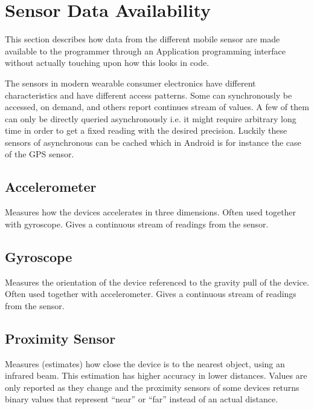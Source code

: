 
\section{Sensor Data Availability}
\label{sec:sensor_data_availability}

This section describes how data from the different mobile sensor are made available to the programmer through an Application programming interface without actually touching upon how this looks in code. 

The sensors in modern wearable consumer electronics have different characteristics and have different access patterns. Some can synchronously be accessed, on demand, and others report continues stream of values. A few of them can only be directly queried asynchronously i.e. it might require arbitrary long time in order to get a fixed reading with the desired precision. Luckily these sensors of asynchronous can be cached which in Android is for instance the case of the GPS sensor.   



\subsection{Accelerometer}
\label{sub:accelerometer}
Measures how the devices accelerates in three dimensions. Often used together with gyroscope. Gives a continuous stream of readings from the sensor.

\subsection{Gyroscope}
\label{sub:gyroscope}
Measures the orientation of the device referenced to the gravity pull of the device. Often used together with accelerometer. Gives a continuous stream of readings from the sensor.

\subsection{Proximity Sensor}
\label{sub:proximity_sensor}
Measures (estimates) how close the device is to the nearest object, using an infrared beam. This estimation has higher accuracy in lower distances. Values are only reported as they change and the proximity sensors of some devices returns binary values that represent ``near'' or ``far'' instead of an actual distance.

